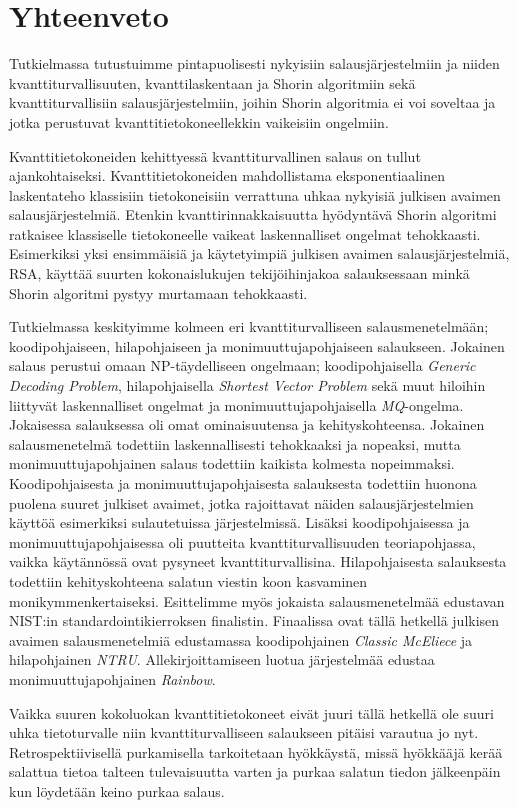 \chapter{Yhteenveto\label{conclusions}}

Tutkielmassa tutustuimme pintapuolisesti nykyisiin salausjärjestelmiin ja niiden kvanttiturvallisuuten, kvanttilaskentaan ja Shorin algoritmiin sekä kvanttiturvallisiin salausjärjestelmiin, joihin Shorin algoritmia ei voi soveltaa ja jotka perustuvat kvanttitietokoneellekkin vaikeisiin ongelmiin.

Kvanttitietokoneiden kehittyessä kvanttiturvallinen salaus on tullut ajankohtaiseksi. Kvanttitietokoneiden mahdollistama eksponentiaalinen laskentateho klassisiin tietokoneisiin verrattuna uhkaa nykyisiä julkisen avaimen salausjärjestelmiä. Etenkin kvanttirinnakkaisuutta hyödyntävä Shorin algoritmi ratkaisee klassiselle tietokoneelle vaikeat laskennalliset ongelmat tehokkaasti. Esimerkiksi yksi ensimmäisiä ja käytetyimpiä julkisen avaimen salausjärjestelmiä, RSA, käyttää suurten kokonaislukujen tekijöihinjakoa salauksessaan minkä Shorin algoritmi pystyy murtamaan tehokkaasti.

Tutkielmassa keskityimme kolmeen eri kvanttiturvalliseen salausmenetelmään; koodipohjaiseen, hilapohjaiseen ja monimuuttujapohjaiseen salaukseen. Jokainen salaus perustui omaan NP-täydelliseen ongelmaan; koodipohjaisella  \emph{Generic Decoding Problem}, hilapohjaisella \emph{Shortest Vector Problem} sekä muut hiloihin liittyvät laskennalliset ongelmat ja monimuuttujapohjaisella \emph{MQ}-ongelma. Jokaisessa salauksessa oli omat ominaisuutensa ja kehityskohteensa. Jokainen salausmenetelmä todettiin laskennallisesti tehokkaaksi ja nopeaksi, mutta monimuuttujapohjainen salaus todettiin kaikista kolmesta nopeimmaksi. Koodipohjaisesta ja monimuuttujapohjaisesta salauksesta todettiin huonona puolena suuret julkiset avaimet, jotka rajoittavat näiden salausjärjestelmien käyttöä esimerkiksi sulautetuissa järjestelmissä. Lisäksi koodipohjaisessa ja monimuuttujapohjaisessa oli puutteita kvanttiturvallisuuden teoriapohjassa, vaikka käytännössä ovat pysyneet kvanttiturvallisina. Hilapohjaisesta salauksesta todettiin kehityskohteena salatun viestin koon kasvaminen monikymmenkertaiseksi. Esittelimme myös jokaista salausmenetelmää edustavan NIST:in standardointikierroksen finalistin. Finaalissa ovat tällä hetkellä julkisen avaimen salausmenetelmiä edustamassa koodipohjainen \emph{Classic McEliece} ja hilapohjainen \emph{NTRU}. Allekirjoittamiseen luotua järjestelmää edustaa monimuuttujapohjainen \emph{Rainbow}.

Vaikka suuren kokoluokan kvanttitietokoneet eivät juuri tällä hetkellä ole suuri uhka tietoturvalle niin kvanttiturvalliseen salaukseen pitäisi varautua jo nyt. Retrospektiivisellä purkamisella tarkoitetaan hyökkäystä, missä hyökkääjä kerää salattua tietoa talteen tulevaisuutta varten ja purkaa salatun tiedon jälkeenpäin kun löydetään keino purkaa salaus.